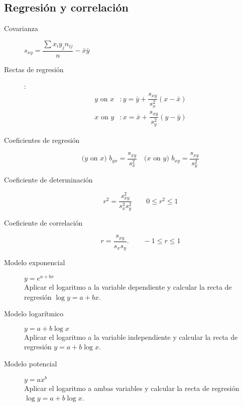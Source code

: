 \begin{multicols*}{2}
\subsection*{Regresión y correlación}

\begin{tcolorbox}[hbox, title=Regresión lineal]
\begin{minipage}{0.4\textwidth}
\begin{description}
\item [Covarianza] $s_{xy}=\dfrac{\sum x_iy_jn_{ij}}{n}-\bar{x}\bar{y}$
\item [Rectas de regresión]:
      \begin{align*}
      \mbox{$y$ on $x$} & : y=\bar{y}+\dfrac{s_{xy}}{s_x^2}(x-\bar{x}) \\
      \mbox{$x$ on $y$} & : x=\bar{x}+\dfrac{s_{xy}}{s_y^2}(y-\bar{y})
      \end{align*}
\item [Coeficientes de regresión]
      \[
      \mbox{($y$ on $x$) } b_{yx}=\dfrac{s_{xy}}{s_x^2}\quad \mbox{($x$ on
      $y$) } b_{xy}=\dfrac{s_{xy}}{s_y^2}
      \]
\item[Coeficiente de determinación]
      \[r^2=\dfrac{s_{xy}^2}{s_x^2s_y^2} \qquad 0\leq r^2\leq 1\]
\item[Coeficiente de correlación]
      \[r=\dfrac{s_{xy}}{s_xs_y}.\qquad -1\leq r\leq 1\]
\end{description}
\end{minipage}
\end{tcolorbox}

\medskip

\begin{tcolorbox}[hbox, title=Regresión no lineal]
\begin{minipage}{0.4\textwidth}
\begin{description}
\item[Modelo exponencial] $y=e^{a+bx}$\\
      Aplicar el logaritmo a la variable dependiente y calcular la recta de regresión $\log y = a+bx$.
\item[Modelo logarítmico] $y=a+b\log x$\\
      Aplicar el logaritmo a la variable independiente y calcular la recta de regresión $y=a+b\log x$.
\item[Modelo potencial] $y=ax^b$\\
      Aplicar el logaritmo a ambas variables y calcular la recta de regresión $\log y = a+b\log x$.
\end{description}
\end{minipage}
\end{tcolorbox}


\end{multicols*}
